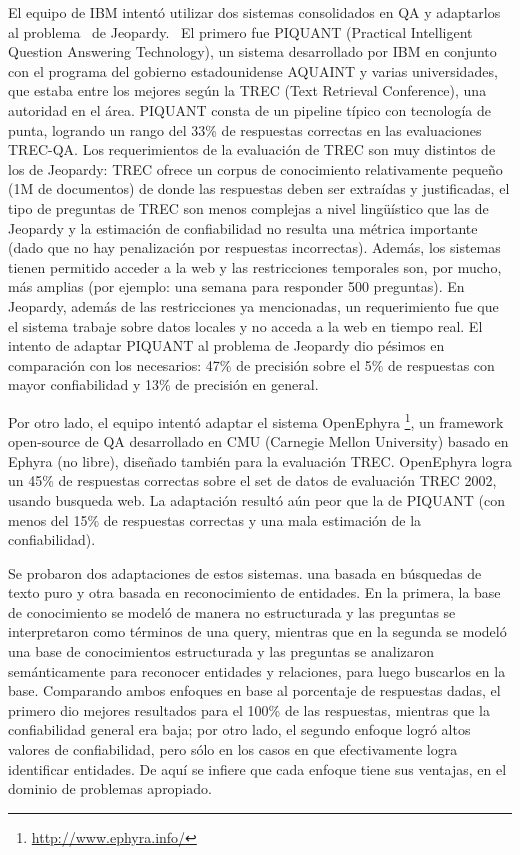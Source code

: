 El equipo de IBM intentó utilizar dos sistemas consolidados en QA y
adaptarlos al problema \ de Jeopardy. \ El primero fue PIQUANT
(Practical Intelligent Question Answering Technology), un sistema
desarrollado por IBM en conjunto con el programa del gobierno
estadounidense AQUAINT y varias universidades, que estaba entre los
mejores según la TREC (Text Retrieval Conference), una autoridad en
el área. PIQUANT consta de un pipeline típico con
tecnología de punta, logrando un rango del 33\% de respuestas
correctas en las evaluaciones TREC-QA. Los requerimientos de la
evaluación de TREC son muy distintos de los de Jeopardy: TREC ofrece
un corpus de conocimiento relativamente pequeño (1M de documentos) de
donde las respuestas deben ser extraídas y justificadas, el tipo de
preguntas de TREC son menos complejas a nivel ling\"uístico que las
de Jeopardy y la estimación de confiabilidad no resulta una métrica
importante (dado que no hay penalización por respuestas incorrectas).
Además, los sistemas tienen permitido acceder a la web y las
restricciones temporales son, por mucho, más amplias (por ejemplo:
una semana para responder 500 preguntas). En Jeopardy, además de las
restricciones ya mencionadas, un requerimiento fue que el sistema
trabaje sobre datos locales y no acceda a la web en tiempo real. El
intento de adaptar PIQUANT al problema de Jeopardy dio pésimos en
comparación con los necesarios: 47\% de precisión sobre el 5\% de
respuestas con mayor confiabilidad y 13\% de precisión en general. 

Por otro lado, el equipo intentó adaptar el sistema OpenEphyra \footnote{\url{http://www.ephyra.info/}}, un framework open-source de QA desarrollado en
CMU (Carnegie Mellon University) basado en Ephyra (no libre), diseñado también para la evaluación TREC. OpenEphyra logra un 45\% de respuestas correctas sobre el set de datos de evaluación TREC
2002, usando busqueda web. La adaptación resultó aún peor que la de PIQUANT (con menos del 15\% de respuestas correctas y una mala estimación de la confiabilidad). 

Se probaron dos adaptaciones de estos sistemas. una basada en búsquedas de texto puro y otra basada en reconocimiento de entidades. En la primera, la base de conocimiento se modeló de manera no
estructurada y las preguntas se interpretaron como términos de una query, mientras que en la segunda se modeló una base de conocimientos estructurada y las preguntas se analizaron semánticamente para
reconocer entidades y relaciones, para luego buscarlos en la base. Comparando ambos enfoques en base al porcentaje de respuestas dadas, el primero dio mejores resultados para el 100\% de las respuestas,
mientras que la confiabilidad general era baja; por otro lado, el segundo enfoque logró altos valores de confiabilidad, pero sólo en los casos en que efectivamente logra identificar entidades. De aquí
se infiere que cada enfoque tiene sus ventajas, en el dominio de problemas apropiado.

